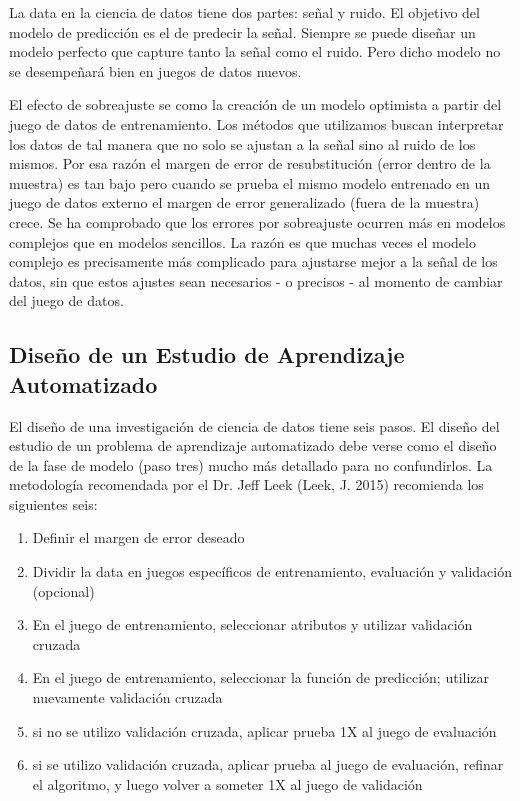 La data en la ciencia de datos tiene dos partes: señal y ruido. El objetivo del modelo de predicción es el de predecir la señal. Siempre se puede diseñar un modelo perfecto que capture tanto la señal como el ruido. Pero dicho modelo no se desempeñará bien en juegos de datos nuevos. 

El efecto de sobreajuste se como la creación de un modelo optimista a partir del juego de datos de entrenamiento. Los métodos que utilizamos buscan interpretar los datos de tal manera que no solo se ajustan a la señal sino al ruido de los mismos. Por esa razón el margen de error de resubstitución (error dentro de la muestra) es tan bajo pero cuando se prueba el mismo modelo entrenado en un juego de datos externo el margen de error generalizado (fuera de la muestra) crece. Se ha comprobado que los errores por sobreajuste ocurren más en modelos complejos que en modelos sencillos. La razón es que muchas veces el modelo complejo es precisamente más complicado para ajustarse mejor a la señal de los datos, sin que estos ajustes sean necesarios - o precisos - al momento de cambiar del juego de datos. 

\subsection{Diseño de un Estudio de Aprendizaje Automatizado}
El diseño de una investigación de ciencia de datos tiene seis pasos. El diseño del estudio de un problema de aprendizaje automatizado debe verse como el diseño de la fase de modelo (paso tres) mucho más detallado para no confundirlos. La metodología recomendada por el Dr. Jeff Leek (Leek, J. 2015) recomienda los siguientes seis:

\begin{enumerate}
	\item Definir el margen de error deseado
	\item Dividir la data en juegos específicos de entrenamiento, evaluación y validación (opcional)
	\item En el juego de entrenamiento, seleccionar atributos y utilizar validación cruzada
	\item En el juego de entrenamiento, seleccionar la función de predicción; utilizar nuevamente validación cruzada
	\item si no se utilizo validación cruzada, aplicar prueba 1X al juego de evaluación
	\item si se utilizo validación cruzada, aplicar prueba al juego de evaluación, refinar el algoritmo, y luego volver a someter 1X al juego de validación 
\end{enumerate}

